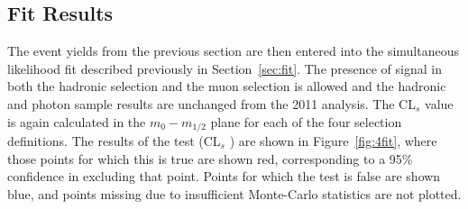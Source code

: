 \subsection{Fit Results}

The event yields from the previous section are then entered into the simultaneous likelihood fit described previously in Section~\ref{sec:fit}. The presence of signal in both the hadronic selection and the muon selection is allowed and the hadronic and photon sample results are unchanged from the 2011 analysis. The CL$_{s}$ value is again calculated in the $m_{0}-m_{1/2}$ plane for each of the four selection definitions. The results of the test (CL$_{s}$ ) are shown in Figure~\ref{fig:4fit}, where those points for which this is true are shown red, corresponding to a 95\% confidence in excluding that point. Points for which the test is false are shown blue, and points missing due to insufficient Monte-Carlo statistics are not plotted. 



